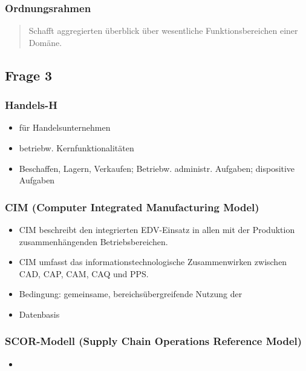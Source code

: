 \documentclass[a4paper]{article}
\begin{document}
			
			
			\subsubsection{Ordnungsrahmen}
			\begin{quote}
				Schafft aggregierten überblick über wesentliche Funktionsbereichen einer Domäne.
			\end{quote}
			
			\pagebreak
			
			\subsection{Frage 3}
			\label{le3-3}
			\subsubsection{Handels-H}
			\begin{itemize}
				\item für Handelsunternehmen
				\item betriebw. Kernfunktionalitäten
				\item Beschaffen, Lagern, Verkaufen; Betriebw. administr. Aufgaben; dispositive Aufgaben
			\end{itemize}
			
			\subsubsection{CIM (Computer Integrated Manufacturing Model)}
			\begin{itemize}
				\item CIM beschreibt den integrierten EDV-Einsatz in allen mit der Produktion zusammenhängenden Betriebsbereichen.
				\item CIM umfasst das informationstechnologische Zusammenwirken zwischen CAD, CAP, CAM, CAQ und PPS.
				\item Bedingung: gemeinsame, bereichsübergreifende Nutzung der
				\item Datenbasis
			\end{itemize}
			
			\subsubsection{SCOR-Modell (Supply Chain Operations Reference Model)}
			\begin{itemize}
				\item 
			\end{itemize}
			
\end{document}

